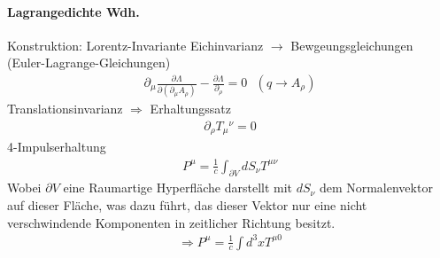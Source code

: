 \documentclass[a4paper]{article}
\begin{document}
\paragraph{Lagrangedichte Wdh.}
Konstruktion: Lorentz-Invariante
Eichinvarianz
$\rightarrow$ Bewgeungsgleichungen (Euler-Lagrange-Gleichungen)
\begin{align}
\partial_\mu \frac{\partial \Lambda}{\partial(\partial_\mu
A_\rho)}-\frac{\partial \Lambda}{\partial_\rho}=0 \text{    } (q\rightarrow
A_\rho)
\end{align}
Translationsinvarianz $\Rightarrow$ Erhaltungssatz
\begin{align}
\partial_\rho T_\mu{}^\nu=0
\end{align}
4-Impulserhaltung
\begin{align}
P^\mu=\frac{1}{c}\int_{\partial V} dS_\nu T^{\mu\nu} 
\end{align}
Wobei $\partial V$ eine Raumartige Hyperfläche darstellt mit $dS_\nu$ dem
Normalenvektor auf dieser Fläche, was dazu führt, das dieser Vektor nur eine
nicht verschwindende Komponenten in zeitlicher Richtung besitzt.
\begin{align}
\Rightarrow P^\mu=\frac{1}{c}\int d^3x T^{\mu0}
\end{align}
\end{document}
